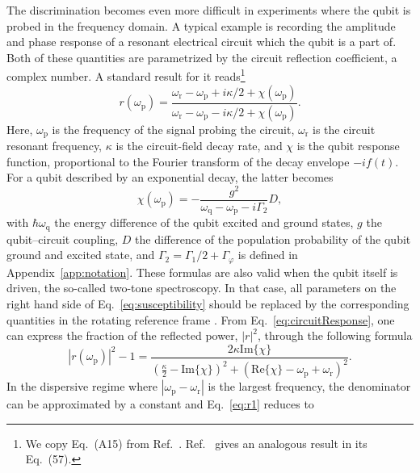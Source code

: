\documentclass[aps, prx, showpacs, twocolumn, superscriptaddress, notitlepage, longbibliography, floatfix, nofootinbib]{revtex4-2}
\begin{document}
The discrimination becomes even more difficult in experiments where the qubit is probed in the frequency domain. A typical example is recording the amplitude and phase response of a resonant electrical circuit which the qubit is a part of. Both of these quantities are parametrized by the circuit reflection coefficient, a complex number. A standard result for it reads\footnote{
We copy Eq.~(A15) from Ref.~\cite{ezzouch_dispersively_2021}. Ref.~\cite{cottet_cavity_2017} gives an analogous result in its Eq.~(57).
}
\begin{equation}
r(\omega_\mathrm{p})=\frac{\omega_\mathrm{r}-\omega_\mathrm{p}+i\kappa/2+\chi(\omega_\mathrm{p})}{\omega_\mathrm{r}-\omega_\mathrm{p}-i\kappa/2+\chi(\omega_\mathrm{p})}.
\label{eq:circuitResponse}
\end{equation}
Here, $\omega_\mathrm{p}$ is the frequency of the signal probing the circuit, $\omega_\mathrm{r}$ is the circuit resonant frequency, 
$\kappa$ is the circuit-field decay rate, 
and $\chi$ is the qubit response function, proportional to the Fourier transform of the decay envelope $-i f(t)$. For a qubit described by an exponential decay, the latter becomes\cite{cottet_cavity_2017,ezzouch_dispersively_2021}
\begin{equation}
\chi(\omega_\mathrm{p}) = -\frac{g^2}{\omega_\mathrm{q}-\omega_\mathrm{p}-i\Gamma_2}D,
\label{eq:susceptibility}
\end{equation}
with $\hbar \omega_\mathrm{q}$ the energy difference of the qubit excited and ground states, $g$ the qubit--circuit coupling, $D$ the difference of the population probability of the qubit ground and excited state, and $\Gamma_2 = \Gamma_1/2 +\Gamma_\varphi$ is defined in Appendix~\ref{app:notation}. These formulas are also valid when the qubit itself is driven, the so-called two-tone spectroscopy\cite{scarlino_all-microwave_2019}. In that case, all parameters on the right hand side of Eq.~\eqref{eq:susceptibility} should be replaced by the corresponding quantities in the rotating reference frame \cite{ithier_decoherence_2005}.
From Eq.~\eqref{eq:circuitResponse}, one can express the fraction of the reflected power, $|r|^2$, through the following formula
\begin{equation}
\label{eq:r1}
|r(\omega_\mathrm{p})|^2 -1 = \frac{2\kappa\mathrm{Im}\{\chi\}}{\left(\frac{\kappa}{2} -\mathrm{Im}\{\chi\}\right)^2 + \left(\mathrm{Re}\{\chi \} -\omega_\mathrm{p} + \omega_\mathrm{r}\right)^2}.
\end{equation}
In the dispersive regime where $|\omega_\mathrm{p}-\omega_\mathrm{r}|$ is the largest frequency, the denominator can be approximated by a constant and Eq.~\eqref{eq:r1} reduces to 
\end{document}
